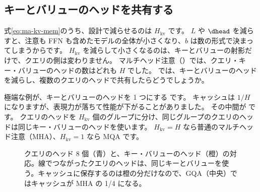 \subsection*{キーとバリューのヘッドを共有する}

式\eqref{eq:ma-kv-mem}のうち、設計で減らせるのは $H_{\mathrm{kv}}$ です。
$L$ や $\dhead$ を減らすと、注意も FFN も含めたモデルの全体が小さくなり、$b$ は数の形式で決まってしまうからです。
$H_{\mathrm{kv}}$ を減らして小さくなるのは、キーとバリューの射影だけで、クエリの側は変わりません。
マルチヘッド注意（）では、クエリ・キー・バリューのヘッドの数はどれも $H$ でした。
では、キーとバリューのヘッドを減らし、複数のクエリのヘッドで共有したらどうでしょうか。

極端な例が、キーとバリューのヘッドを 1 つにする \cite{shazeer2019fast}です。
キャッシュは $1/H$ になりますが、表現力が落ちて性能が下がることがありました。
その中間が \cite{ainslie2023gqa}です。
クエリのヘッドを $H_{\mathrm{kv}}$ 個のグループに分け、同じグループのクエリのヘッドは同じキー・バリューのヘッドを使います。
$H_{\mathrm{kv}}=H$ なら普通のマルチヘッド注意（MHA）、$H_{\mathrm{kv}}=1$ なら MQA です。

\begin{figure}[tbp]
\centering
{}
\caption{クエリのヘッド 8 個（青）と、キー・バリューのヘッド（橙）の対応。線でつながったクエリのヘッドは、同じキーとバリューを使う。キャッシュに保存するのは橙の分だけなので、GQA（中央）ではキャッシュが MHA の 1/4 になる。}
\label{fig:ma-gqa}
\end{figure}

